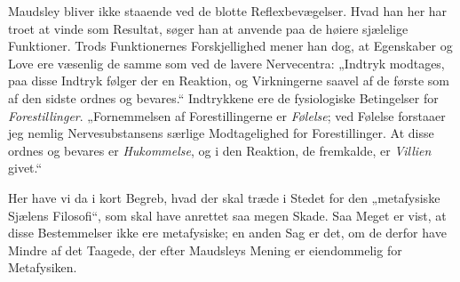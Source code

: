\documentclass[12pt,a4paper,openany]{book}
\newcommand{\opage}[1]{\marginnote{\footnotesize\textit{[#1]}}}
\begin{document}
\opage{317}Maudsley bliver ikke staaende ved de blotte Reflexbevægelser.
Hvad han her har troet at vinde som Resultat,
søger han at anvende paa de høiere sjælelige Funktioner.
Trods Funktionernes Forskjellighed mener han dog, at Egenskaber
og Love ere væsenlig de samme som ved de lavere
Nervecentra: „Indtryk modtages, paa disse Indtryk følger
der en Reaktion, og Virkningerne saavel af de første som af
den sidste ordnes og bevares.“ Indtrykkene ere de fysiologiske
Betingelser for \emph{Forestillinger}. „Fornemmelsen af Forestillingerne
er \emph{Følelse}; ved Følelse forstaaer jeg nemlig
Nervesubstansens særlige Modtagelighed for Forestillinger.
At disse ordnes og bevares er \emph{Hukommelse}, og i den
Reaktion, de fremkalde, er \emph{Villien} givet.“

Her have vi da i kort Begreb, hvad der skal træde i
Stedet for den „metafysiske Sjælens Filosofi“, som skal
have anrettet saa megen Skade. Saa Meget er vist, at disse
Bestemmelser ikke ere metafysiske; en anden Sag er det, om
de derfor have Mindre af det Taagede, der efter Maudsleys
Mening er eiendommelig for Metafysiken.
\end{document}
